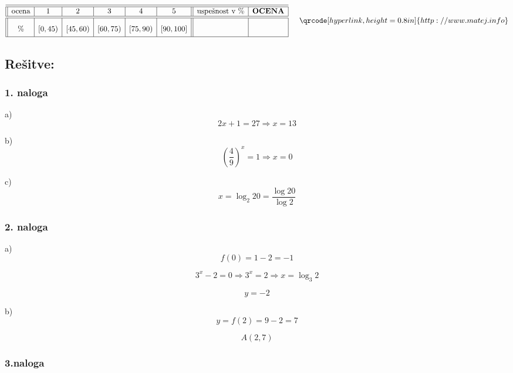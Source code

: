 \documentclass[a4paper,12pt]{letter}
\newcounter{tocke}
\begin{document}
\vfill
{}
\begin{kriterij*}
 $$
 \begin{array}{||c|c|c|c|c|c||
>{}c|c|}
 \hline\hline
 \textup{ocena}& 1&2&3&4&5&\textrm{uspe\v{s}nost v } \%& \textrm{\bf OCENA}\\
  \hline\hline
 \% & [0,45) &[45,60)&[60,75
 ) &[75,90)    &    [90,100]& \mbox{\phantom{ \huge{$\frac{5}{445}$
 15}}
 } 
 & \\
 \hline
 \end{array} \hspace*{0.5cm}\vspace*{-0.3cm} \qrcode[hyperlink,height=0.8in]{http://www.matej.info}
$$
\vspace*{0.1cm}
\end{kriterij*}
\newpage
\subsection{Rešitve:}

\subsubsection{1. naloga}

a)
\[
2x+1=27 \Rightarrow x=13
\]

b)
\[
\left(\frac{4}{9}\right)^x=1 \Rightarrow x=0
\]

c)
\[
x=\log_2 20=\frac{\log 20}{\log 2}
\]


\subsubsection{2. naloga}

a)
\[
f(0)=1-2=-1
\]

\[
3^x-2=0 \Rightarrow 3^x=2 \Rightarrow x=\log_3 2
\]

\[
y=-2
\]

b)
\[
y=f(2)=9-2=7
\]

\[
A(2,7)
\]


\subsubsection{3.naloga }
\end{document}
